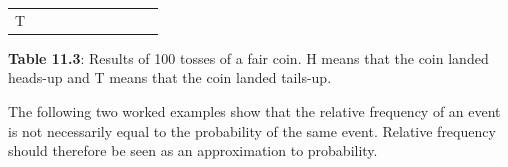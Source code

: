 {\begin{center}
\begin{xtabular*}{\mytablewidth}[t]{|p{10\mystarwidth}|p{10\mystarwidth}|p{10\mystarwidth}|p{10\mystarwidth}|p{10\mystarwidth}|p{10\mystarwidth}|p{10\mystarwidth}|p{10\mystarwidth}|p{10\mystarwidth}|p{10\mystarwidth}|}
        T%
     \tabularnewline{}
    \end{xtabular*}
      \end{center}
    \begin{center}{\small\bfseries Table 11.3}: Results of 100 tosses of a fair coin. H means that the coin
landed heads-up and T means that the coin landed tails-up.\end{center}
    
    \addtocounter{footnote}{-0}
    
        }%
      
    \par
  
      \label{m39373*id113359}The following two worked examples show that the
relative frequency of an event is not necessarily equal to the probability of
the same event. Relative frequency should therefore be seen as an approximation
to probability.\par 
\label{m39373*secfhsst!!!underscore!!!id504}\vspace{.5cm} 
      
